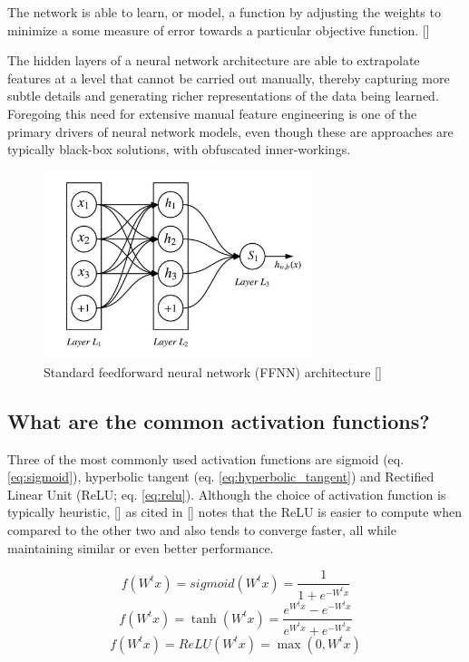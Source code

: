 \documentclass[12pt, a4paper]{report}
\theoremstyle{definition}
\theoremstyle{definition}%
\theoremstyle{definition}%
\theoremstyle{definition}%
\theoremstyle{definition}%
\theoremstyle{definition}%
\renewcommand{\cite}[1]{[\citealp{#1}]}
\begin{document}
The network is able to learn, or model, a function by adjusting the weights to minimize a some measure of error towards a particular objective function. \cite{graves2012b}

The hidden layers of a neural network architecture are able to extrapolate features at a level that cannot be carried out manually, thereby capturing more subtle details and generating richer representations of the data being learned. Foregoing this need for extensive manual feature engineering is one of the primary drivers of neural network models, even though these are approaches are typically black-box solutions, with obfuscated inner-workings.

\begin{figure}[!ht]
	\centering
	\includegraphics[width=0.7\textwidth]{./figures/ffnn.jpg}
	\caption{Standard feedforward neural network (FFNN) architecture \cite{zhang2018}}
	\label{fig:ffnn}
\end{figure}

\subsection{What are the common activation functions?}
Three of the most commonly used activation functions are sigmoid (eq. \ref{eq:sigmoid}), hyperbolic tangent (eq. \ref{eq:hyperbolic_tangent}) and Rectified Linear Unit (ReLU; eq. \ref{eq:relu}). Although the choice of activation function is typically heuristic, \cite{glorot2011} as cited in \cite{zhang2018} notes that the ReLU is easier to compute when compared to the other two and also tends to converge faster, all while maintaining similar or even better performance.

\begin{equation} \label{eq:sigmoid}
	f(W^tx) = sigmoid(W^tx) = \frac{1}{1+e^{-W^tx}}
\end{equation}
\begin{equation} \label{eq:hyperbolic_tangent}
	f(W^tx) = \tanh(W^tx) = \frac{e^{W^tx}-e^{-W^tx}}{e^{W^tx}+e^{-W^tx}}
\end{equation}
\begin{equation} \label{eq:relu}
	f(W^tx) = ReLU(W^tx) = \max(0,W^tx)
\end{equation}
\end{document}
